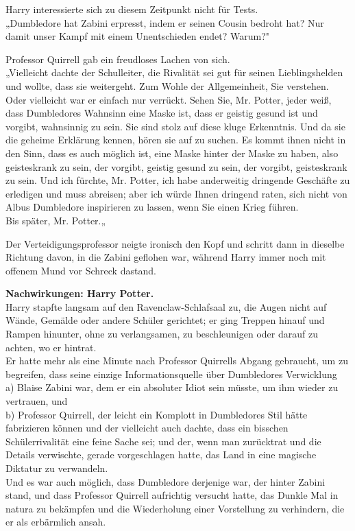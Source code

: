 {Harry interessierte sich zu diesem Zeitpunkt nicht für Tests.\\ „Dumbledore hat Zabini erpresst, indem er seinen Cousin bedroht hat? Nur damit unser Kampf mit einem Unentschieden endet? Warum?"

Professor Quirrell gab ein freudloses Lachen von sich.\\ „Vielleicht dachte der Schulleiter, die Rivalität sei gut für seinen Lieblingshelden und wollte, dass sie weitergeht. Zum Wohle der Allgemeinheit, Sie verstehen. Oder vielleicht war er einfach nur verrückt. Sehen Sie, Mr. Potter, jeder weiß, dass Dumbledores Wahnsinn eine Maske ist, dass er geistig gesund ist und vorgibt, wahnsinnig zu sein. Sie sind stolz auf diese kluge Erkenntnis. Und da sie die geheime Erklärung kennen, hören sie auf zu suchen. Es kommt ihnen nicht in den Sinn, dass es auch möglich ist, eine Maske hinter der Maske zu haben, also geisteskrank zu sein, der vorgibt, geistig gesund zu sein, der vorgibt, geisteskrank zu sein. Und ich fürchte, Mr. Potter, ich habe anderweitig dringende Geschäfte zu erledigen und muss abreisen; aber ich würde Ihnen dringend raten, sich nicht von Albus Dumbledore inspirieren zu lassen, wenn Sie einen Krieg führen.\\ Bis später, Mr. Potter.„

Der Verteidigungsprofessor neigte ironisch den Kopf und schritt dann in dieselbe Richtung davon, in die Zabini geflohen war, während Harry immer noch mit offenem Mund vor Schreck dastand.

\textbf{Nachwirkungen: Harry Potter.}\\ Harry stapfte langsam auf den Ravenclaw-Schlafsaal zu, die Augen nicht auf Wände, Gemälde oder andere Schüler gerichtet; er ging Treppen hinauf und Rampen hinunter, ohne zu verlangsamen, zu beschleunigen oder darauf zu achten, wo er hintrat.\\ Er hatte mehr als eine Minute nach Professor Quirrells Abgang gebraucht, um zu begreifen, dass seine einzige Informationsquelle über Dumbledores Verwicklung\\ a) Blaise Zabini war, dem er ein absoluter Idiot sein müsste, um ihm wieder zu vertrauen, und\\ b) Professor Quirrell, der leicht ein Komplott in Dumbledores Stil hätte fabrizieren können und der vielleicht auch dachte, dass ein bisschen Schülerrivalität eine feine Sache sei; und der, wenn man zurücktrat und die Details verwischte, gerade vorgeschlagen hatte, das Land in eine magische Diktatur zu verwandeln.\\ Und es war auch möglich, dass Dumbledore derjenige war, der hinter Zabini stand, und dass Professor Quirrell aufrichtig versucht hatte, das Dunkle Mal in natura zu bekämpfen und die Wiederholung einer Vorstellung zu verhindern, die er als erbärmlich ansah.

}
